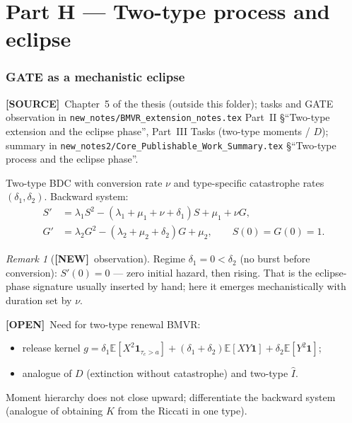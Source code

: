 \documentclass[11pt,a4paper]{article}
\newcommand{\E}{\mathbb{E}}
\newcommand{\Ihat}{\widehat{I}}
\theoremstyle{plain}
\theoremstyle{definition}
\theoremstyle{remark}
\newtheorem{remark}[result]{Remark}
\newcommand{\NEW}{\textcolor{blue!55!black}{\textbf{[NEW]}}}
\newcommand{\OPEN}{\textcolor{red!55!black}{\textbf{[OPEN]}}}
\newcommand{\SOURCE}{\textcolor{gray!50!black}{\textbf{[SOURCE]}}}
\begin{document}
\part*{Part H --- Two-type process and eclipse}

\section{GATE as a mechanistic eclipse}
\label{sec:twotype}
\SOURCE\
Chapter~5 of the thesis (outside this folder);
tasks and GATE observation in
\texttt{new\_notes/BMVR\_extension\_notes.tex}
Part~II \S``Two-type extension and the eclipse phase'',
Part~III Tasks (two-type moments / $D$);
summary in
\texttt{new\_notes2/Core\_Publishable\_Work\_Summary.tex}
\S``Two-type process and the eclipse phase''.

Two-type BDC with conversion rate $\nu$ and type-specific catastrophe rates
$(\delta_1,\delta_2)$. Backward system:
\begin{align}
S'&=\lambda_1 S^2-(\lambda_1+\mu_1+\nu+\delta_1)S+\mu_1+\nu G,\\
G'&=\lambda_2 G^2-(\lambda_2+\mu_2+\delta_2)G+\mu_2,\qquad S(0)=G(0)=1.
\end{align}

\begin{remark}[\NEW\ observation]
Regime $\delta_1=0<\delta_2$ (no burst before conversion): $S'(0)=0$ --- zero
initial hazard, then rising. That is the eclipse-phase signature usually
inserted by hand; here it emerges mechanistically with duration set by $\nu$.
\end{remark}

\OPEN\ Need for two-type renewal BMVR:
\begin{itemize}
\item release kernel
  $g=\delta_1\E[X^2\mathbf 1_{\tau_c>a}]+(\delta_1+\delta_2)\E[XY\mathbf 1]+\delta_2\E[Y^2\mathbf 1]$;
\item analogue of $D$ (extinction without catastrophe) and two-type $\Ihat$.
\end{itemize}
Moment hierarchy does not close upward; differentiate the backward system
(analogue of obtaining $K$ from the Riccati in one type).

\end{document}
